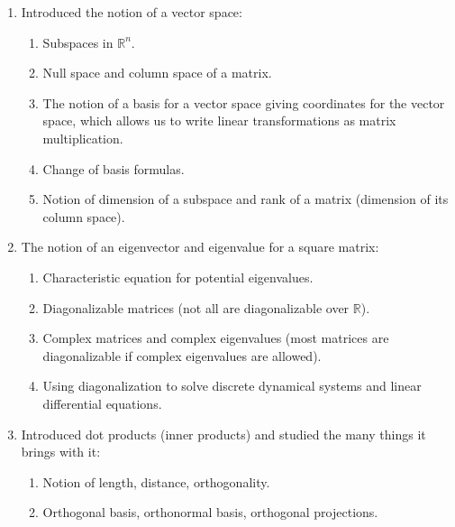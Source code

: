 \documentclass[12pt,letterpaper]{article}
\begin{document}
\begin{enumerate}
 Then, we discovered the determinant of a matrix which gives us a way to determine when a matrix is invertible.
        \begin{enumerate}
            \item Lots of neat properties of determinants ($\det(AB) = \det(A) \det(B)$).
            \item An inductive formula for the determinant using expansion across any row or column.
        \end{enumerate}
        \item Introduced the notion of a vector space:
        \begin{enumerate}
            \item Subspaces in $\mathbb{R}^n$.
            \item Null space and column space of a matrix.
            \item The notion of a basis for a vector space giving coordinates for the vector space, which allows us to write linear transformations as matrix multiplication.
            \item Change of basis formulas.
            \item Notion of dimension of a subspace and rank of a matrix (dimension of its column space).
        \end{enumerate}
        \item The notion of an eigenvector and eigenvalue for a square matrix:
        \begin{enumerate}
            \item Characteristic equation for potential eigenvalues.
            \item Diagonalizable matrices (not all are diagonalizable over $\mathbb{R}$).
            \item Complex matrices and complex eigenvalues (most matrices are diagonalizable if complex eigenvalues are allowed).
            \item Using diagonalization to solve discrete dynamical systems and linear differential equations.
        \end{enumerate}
        \item Introduced dot products (inner products) and studied the many things it brings with it:
        \begin{enumerate}
            \item Notion of length, distance, orthogonality.
            \item Orthogonal basis, orthonormal basis, orthogonal projections.

\end{enumerate}
\end{enumerate}
\end{document}
